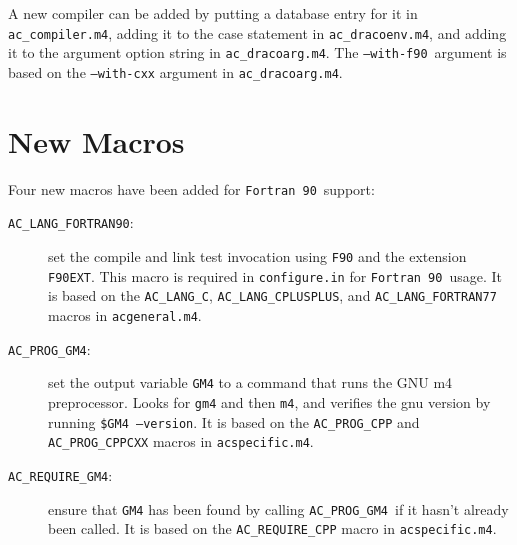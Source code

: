 \documentclass[11pt]{nmemo}
\newcommand{\fninety}{\texttt{Fortran~90}}
\newcommand{\withfninety}{\texttt{--with-f90}}
\newcommand{\langfninety}{\texttt{AC\_LANG\_FORTRAN90}}
\newcommand{\requiregmfour}{\texttt{AC\_REQUIRE\_GM4}}
\newcommand{\proggmfour}{\texttt{AC\_PROG\_GM4}}
\begin{document}
A new compiler can be added by putting a database entry for it in
\texttt{ac\_compiler.m4}, adding it to the case statement in
\texttt{ac\_dracoenv.m4}, and adding it to the argument option string
in \texttt{ac\_dracoarg.m4}.  The \withfninety\ argument is based on
the \texttt{--with-cxx} argument in \texttt{ac\_dracoarg.m4}.

\section{New Macros}

Four new macros have been added for \fninety\ support:
\begin{description}
\item[\langfninety:] set the compile and link test invocation using
\texttt{F90} and the extension \texttt{F90EXT}.  This macro is
required in \texttt{configure.in} for \fninety\ usage.  It is based on
the \texttt{AC\_LANG\_C}, \texttt{AC\_LANG\_CPLUSPLUS}, and
\texttt{AC\_LANG\_FORTRAN77} macros in \texttt{acgeneral.m4}.

\item[\proggmfour:] set the output variable \texttt{GM4} to a command
that runs the GNU m4 preprocessor.  Looks for \texttt{gm4} and then
\texttt{m4}, and verifies the gnu version by running
\texttt{\${GM4}~--version}.  It is based on the \texttt{AC\_PROG\_CPP}
and \texttt{AC\_PROG\_CPPCXX} macros in \texttt{acspecific.m4}.

\item[\requiregmfour:] ensure that \texttt{GM4} has been found by
calling \proggmfour\ if it hasn't already been called.  It is based on
the \texttt{AC\_REQUIRE\_CPP} macro in \texttt{acspecific.m4}.


\end{description}
\end{document}
